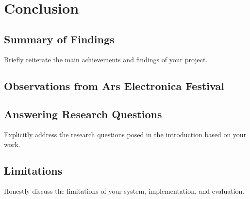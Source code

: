 \chapter{Conclusion}
    \section{Summary of Findings} Briefly reiterate the main achievements and findings of your project.
    \section{Observations from Ars Electronica Festival} 
    \section{Answering Research Questions} Explicitly address the research questions posed in the introduction based on your work.
    \section{Limitations} Honestly discuss the limitations of your system, implementation, and evaluation.